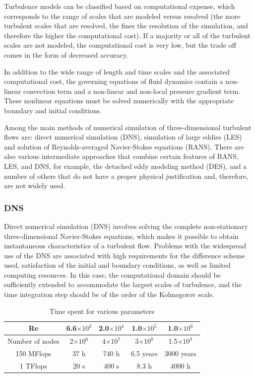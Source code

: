 	Turbulence models can be classified based on computational expense, which corresponds to the range of scales that are modeled versus resolved (the more turbulent scales that are resolved, the finer the resolution of the simulation, and therefore the higher the computational cost). If a majority or all of the turbulent scales are not modeled, the computational cost is very low, but the trade off comes in the form of decreased accuracy.
	
	In addition to the wide range of length and time scales and the associated computational cost, the governing equations of fluid dynamics contain a non-linear convection term and a non-linear and non-local pressure gradient term. These nonlinear equations must be solved numerically with the appropriate boundary and initial conditions.
	
	Among the main methods of numerical simulation of three-dimensional turbulent flows are: direct numerical simulation (DNS), simulation of large eddies (LES) and solution of Reynolds-averaged Navier-Stokes equations (RANS). There are also various intermediate approaches that combine certain features of RANS, LES, and DNS, for example, the detached eddy modeling method (DES), and a number of others that do not have a proper physical justification and, therefore, are not widely used.
	
\subsubsection{DNS}
	Direct numerical simulation (DNS) involves solving the complete non-stationary three-dimensional Navier-Stokes equations, which makes it possible to obtain instantaneous characteristics of a turbulent flow. Problems with the widespread use of the DNS are associated with high requirements for the difference scheme used, satisfaction of the initial and boundary conditions, as well as limited computing resources. In this case, the computational domain should be sufficiently extended to accommodate the largest scales of turbulence, and the time integration step should be of the order of the Kolmogorov scale.
	\begin{table}[H]
		\begin{center}
			\begin{tabular}{|c|c|c|c|c|}
				\hline
				Re & 6.6$\times10^3$ & 2.0$\times10^4$ & 1.0$\times10^5$ & 1.0$\times10^6$\\
				\hline
				Number of nodes & 2$\times10^6$ & 4$\times10^7$ & 3$\times10^8$ & 1.5$\times10^3$\\
				\hline
				150 MFlops & 37 h & 740 h & 6.5 years & 3000 years\\
				\hline
				1 TFlops & 20 s & 400 s & 8.3 h & 4000 h\\
				\hline
			\end{tabular}
		\end{center}
		\caption{Time spent for various parameters}
	\end{table}
	

